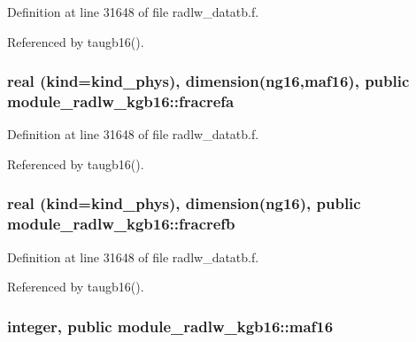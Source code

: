 Definition at line 31648 of file radlw\+\_\+datatb.\+f.



Referenced by taugb16().

\subsubsection[{\texorpdfstring{fracrefa}{fracrefa}}]{\setlength{\rightskip}{0pt plus 5cm}real (kind=kind\+\_\+phys), dimension(ng16,{\bf maf16}), public module\+\_\+radlw\+\_\+kgb16\+::fracrefa}\hypertarget{namespacemodule__radlw__kgb16_a355dcc9f6f4955ab3d7ee0a22005c8ba}{}\label{namespacemodule__radlw__kgb16_a355dcc9f6f4955ab3d7ee0a22005c8ba}


Definition at line 31648 of file radlw\+\_\+datatb.\+f.



Referenced by taugb16().

\subsubsection[{\texorpdfstring{fracrefb}{fracrefb}}]{\setlength{\rightskip}{0pt plus 5cm}real (kind=kind\+\_\+phys), dimension(ng16), public module\+\_\+radlw\+\_\+kgb16\+::fracrefb}\hypertarget{namespacemodule__radlw__kgb16_ab93affafac8e2bb182982133a6449de4}{}\label{namespacemodule__radlw__kgb16_ab93affafac8e2bb182982133a6449de4}


Definition at line 31648 of file radlw\+\_\+datatb.\+f.



Referenced by taugb16().

\subsubsection[{\texorpdfstring{maf16}{maf16}}]{\setlength{\rightskip}{0pt plus 5cm}integer, public module\+\_\+radlw\+\_\+kgb16\+::maf16}\hypertarget{namespacemodule__radlw__kgb16_aae4c96f4a2ae49c573189f2d63ccd4a3}{}\label{namespacemodule__radlw__kgb16_aae4c96f4a2ae49c573189f2d63ccd4a3}


